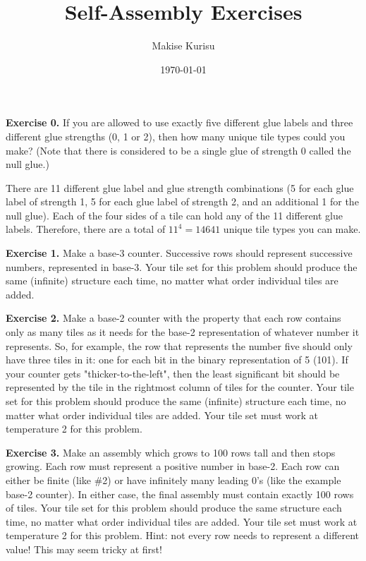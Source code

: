 \documentclass[11pt]{report}
\makeatletter
\renewcommand{\maketitle}{
        {\Large \bf \@title}
        \vspace{0.75em}

        {\normalsize \@author}
        \vspace{0.25em}

        {\normalsize \@date}
        \vspace{1em}

}
\makeatother
\begin{document}
\title{Self-Assembly Exercises}
\date{\today}
\author{Makise Kurisu}
\maketitle

\textbf{Exercise 0.}
If you are allowed to use exactly five different glue labels and three different glue strengths (0,
1 or 2), then how many unique tile types could you make? (Note that there is considered to be a
single glue of strength 0 called the null glue.)

There are 11 different glue label and glue strength combinations (5 for each glue label of
strength 1, 5 for each glue label of strength 2, and an additional 1 for the null glue). Each of the
four sides of a tile can hold any of the 11 different glue labels. Therefore, there are a total of
$11^4 = 14641$ unique tile types you can make.

\textbf{Exercise 1.}
Make a base-3 counter. Successive rows should represent successive numbers, represented in base-3.
Your tile set for this problem should produce the same (infinite) structure each time, no matter
what order individual tiles are added. 

\textbf{Exercise 2.} 
Make a base-2 counter with the property that each row contains only as many tiles as it needs for
the base-2  representation of whatever number it represents. So, for example, the row that
represents the number five should only have three tiles in it: one for each bit in the binary
representation of 5 (101). If your counter gets "thicker-to-the-left", then the least significant
bit should be represented by the tile in the rightmost column of tiles for the counter. Your tile
set for this problem should produce the same (infinite) structure each time, no matter what order
individual tiles are added. Your tile set must work at temperature 2 for this problem.

\textbf{Exercise 3.}
Make an assembly which grows to 100 rows tall and then stops growing. Each row must represent a
positive number in base-2. Each row can either be finite (like \#2) or have infinitely many leading
0's (like the example base-2 counter). In either case, the final assembly must contain exactly 100
rows of tiles. Your tile set for this problem should produce the same structure each time, no matter
what order individual tiles are added. Your tile set must work at temperature 2 for this problem.
Hint: not every row needs to represent a different value! This may seem tricky at first! 
\end{document}
